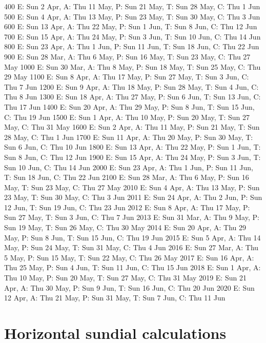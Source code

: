 \begin{itemize}
\begin{wideverbatim}
 400 E: Sun  2 Apr, A: Thu 11 May, P: Sun 21 May, T: Sun 28 May, C: Thu  1 Jun
 500 E: Sun  4 Apr, A: Thu 13 May, P: Sun 23 May, T: Sun 30 May, C: Thu  3 Jun
 600 E: Sun 13 Apr, A: Thu 22 May, P: Sun  1 Jun, T: Sun  8 Jun, C: Thu 12 Jun
 700 E: Sun 15 Apr, A: Thu 24 May, P: Sun  3 Jun, T: Sun 10 Jun, C: Thu 14 Jun
 800 E: Sun 23 Apr, A: Thu  1 Jun, P: Sun 11 Jun, T: Sun 18 Jun, C: Thu 22 Jun
 900 E: Sun 28 Mar, A: Thu  6 May, P: Sun 16 May, T: Sun 23 May, C: Thu 27 May
1000 E: Sun 30 Mar, A: Thu  8 May, P: Sun 18 May, T: Sun 25 May, C: Thu 29 May
1100 E: Sun  8 Apr, A: Thu 17 May, P: Sun 27 May, T: Sun  3 Jun, C: Thu  7 Jun
1200 E: Sun  9 Apr, A: Thu 18 May, P: Sun 28 May, T: Sun  4 Jun, C: Thu  8 Jun
1300 E: Sun 18 Apr, A: Thu 27 May, P: Sun  6 Jun, T: Sun 13 Jun, C: Thu 17 Jun
1400 E: Sun 20 Apr, A: Thu 29 May, P: Sun  8 Jun, T: Sun 15 Jun, C: Thu 19 Jun
1500 E: Sun  1 Apr, A: Thu 10 May, P: Sun 20 May, T: Sun 27 May, C: Thu 31 May
1600 E: Sun  2 Apr, A: Thu 11 May, P: Sun 21 May, T: Sun 28 May, C: Thu  1 Jun
1700 E: Sun 11 Apr, A: Thu 20 May, P: Sun 30 May, T: Sun  6 Jun, C: Thu 10 Jun
1800 E: Sun 13 Apr, A: Thu 22 May, P: Sun  1 Jun, T: Sun  8 Jun, C: Thu 12 Jun
1900 E: Sun 15 Apr, A: Thu 24 May, P: Sun  3 Jun, T: Sun 10 Jun, C: Thu 14 Jun
2000 E: Sun 23 Apr, A: Thu  1 Jun, P: Sun 11 Jun, T: Sun 18 Jun, C: Thu 22 Jun
2100 E: Sun 28 Mar, A: Thu  6 May, P: Sun 16 May, T: Sun 23 May, C: Thu 27 May
2010 E: Sun  4 Apr, A: Thu 13 May, P: Sun 23 May, T: Sun 30 May, C: Thu  3 Jun
2011 E: Sun 24 Apr, A: Thu  2 Jun, P: Sun 12 Jun, T: Sun 19 Jun, C: Thu 23 Jun
2012 E: Sun  8 Apr, A: Thu 17 May, P: Sun 27 May, T: Sun  3 Jun, C: Thu  7 Jun
2013 E: Sun 31 Mar, A: Thu  9 May, P: Sun 19 May, T: Sun 26 May, C: Thu 30 May
2014 E: Sun 20 Apr, A: Thu 29 May, P: Sun  8 Jun, T: Sun 15 Jun, C: Thu 19 Jun
2015 E: Sun  5 Apr, A: Thu 14 May, P: Sun 24 May, T: Sun 31 May, C: Thu  4 Jun
2016 E: Sun 27 Mar, A: Thu  5 May, P: Sun 15 May, T: Sun 22 May, C: Thu 26 May
2017 E: Sun 16 Apr, A: Thu 25 May, P: Sun  4 Jun, T: Sun 11 Jun, C: Thu 15 Jun
2018 E: Sun  1 Apr, A: Thu 10 May, P: Sun 20 May, T: Sun 27 May, C: Thu 31 May
2019 E: Sun 21 Apr, A: Thu 30 May, P: Sun  9 Jun, T: Sun 16 Jun, C: Thu 20 Jun
2020 E: Sun 12 Apr, A: Thu 21 May, P: Sun 31 May, T: Sun  7 Jun, C: Thu 11 Jun

\end{wideverbatim}

\pagebreak{}
\section*{Horizontal sundial calculations}


\end{itemize}
